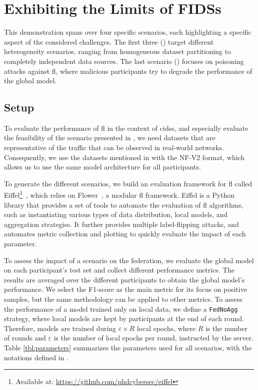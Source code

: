 \section{Exhibiting the Limits of FIDSs\label{sec:demo}}

This demonstration spans over four specific scenarios, each highlighting a specific aspect of the considered challenges.
The first three () target different heterogeneity scenarios, ranging from homogeneous dataset partitioning to completely independent data sources.
The last scenario () focuses on poisoning attacks against \gls{fl}, where malicious participants try to degrade the performance of the global model.


\subsection{Setup\label{sec:demo.setup}}

To evaluate the performance of \gls{fl} in the context of \glspl{cids}, and especially evaluate the feasibility of the scenario presented in , we need datasets that are representative of the traffic that can be observed in real-world networks.
Consequently, we use the datasets mentioned in  with the NF-V2 format, which allows us to use the same model architecture for all participants.

To generate the different scenarios, we build an evaluation framework for \gls{fl} called Eiffel\footnote{Available at: \url{https://github.com/phdcybersec/eiffel}}~\cite{lavaur_icdcs_demo_2024}, which relies on Flower~\cite{beutel_Flowerfriendlyfederated_2020}, a modular \gls{fl} framework. 
Eiffel is a Python library that provides a set of tools to automate the evaluation of \gls{fl} algorithms, such as instantiating various types of data distribution, local models, and aggregation strategies.
It further provides multiple label-flipping attacks, and automates metric collection and plotting to quickly evaluate the impact of each parameter.

To assess the impact of a scenario on the federation, we evaluate the global model on each participant's test set and collect different performance metrics.
The results are averaged over the different participants to obtain the global model's performance.
We select the F1-score as the main metric for its focus on positive samples, but the same methodology can be applied to other metrics.
To assess the performance of a model trained only on local data, we define a \texttt{FedNoAgg} strategy, where local models are kept by participants at the end of each round. 
Therefore, models are trained during $\varepsilon \times R$ local epochs, where $R$ is the number of rounds and $\varepsilon$ is the number of local epochs per round, instructed by the server.
Table \ref{tbl:parameters} summarizes the parameters used for all scenarios, with the notations defined in .


